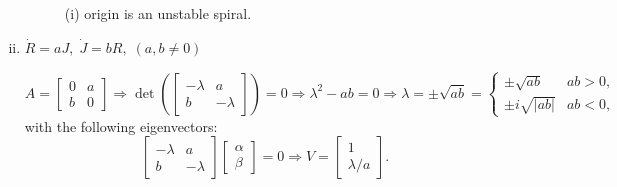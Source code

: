 \documentclass[12pt]{article}
\begin{document}
\begin{ex}
\begin{solution}
\begin{enumerate}[(i)]
  \begin{figure}[h]
    \centering
    \caption{(i) origin is an unstable spiral.}
    \label{Figure_i}
  \end{figure}

  \item $\dot{R}=aJ,\;\dot{J}=bR,\;(a,b\neq 0)$

  \begin{equation*}
    A=
    \begin{bmatrix}
      0 & a\\
      b & 0
    \end{bmatrix}
    \Rightarrow \det\left(
    \begin{bmatrix}
      -\lambda & a\\
      b & -\lambda
    \end{bmatrix}
    \right)=0\Rightarrow \lambda^2-ab=0\Rightarrow \lambda=\pm\sqrt{ab}=
    \begin{cases}
      \pm\sqrt{ab} & ab>0,\\
      \pm i\sqrt{\lvert ab\rvert} & ab<0,
    \end{cases}
  \end{equation*}
  with the following eigenvectors:
  \begin{equation*}
    \begin{bmatrix}
      -\lambda & a\\
      b & -\lambda
    \end{bmatrix}
    \begin{bmatrix}
      \alpha\\
      \beta
    \end{bmatrix}
    =0\Rightarrow V=
    \begin{bmatrix}
      1\\
      \lambda/a
    \end{bmatrix}.
  \end{equation*}


\end{enumerate}
\end{solution}
\end{ex}
\end{document}

